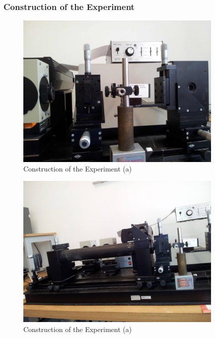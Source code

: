 \subsubsection{Construction of the Experiment}

\begin{figure}
\includegraphics[width=10cm]{pics/const1}
\caption{Construction of the Experiment (a)}
\label{fig:const1}
\end{figure}
\begin{figure}
\includegraphics[width=10cm]{pics/const2}
\caption{Construction of the Experiment (a)}
\label{fig:const2}
\end{figure}

